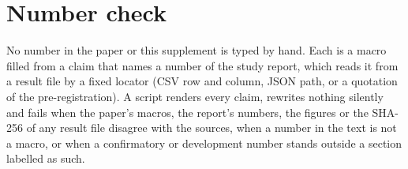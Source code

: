 \documentclass[10pt,twocolumn,letterpaper]{article}
\begin{document}
\section{Number check}
\label{sec:numbercheck}

No number in the paper or this supplement is typed by hand. Each is a macro filled from a claim that names a number of
the study report, which reads it from a result file by a fixed locator (CSV row and column, JSON path, or a quotation
of the pre-registration). A script renders every claim, rewrites nothing silently and fails when the paper's macros,
the report's numbers, the figures or the SHA-256 of any result file disagree with the sources, when a number in the
text is not a macro, or when a confirmatory or development number stands outside a section labelled as such.
\end{document}

